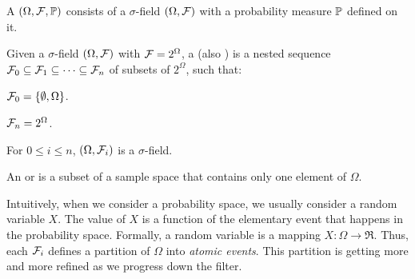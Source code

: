 \begin{defn}
    A  $(\Omega, \mathcal{F}, \mathbb{P})$ consists
    of a $\sigma$-field $(\Omega,\mathcal{F})$ with a probability measure
    $\mathbb{P}$ defined on it.
\end{defn}


\begin{defn}
    Given a $\sigma$-field $(\Omega, \mathcal{F})$ with $\mathcal{F}=2^{\Omega}$, a
     (also ) is a nested sequence $\mathcal{F}_0
    \subseteq \mathcal{F}_1 \subseteq \cdots \subseteq \mathcal{F}_n$ of subsets of
    $2^{\Omega}$, such that:
    \begin{compactenumA}
        \item $\mathcal{F}_0 = \left\{ {\emptyset, \Omega} \right\}$.
        \item $\mathcal{F}_n = 2^{\Omega}$.
        \item For $0\leq i \leq n$, $(\Omega, \mathcal{F}_i)$ is a
        $\sigma$-field.
    \end{compactenumA}
\end{defn}


\begin{defn}
    An  or  is a subset of
    a sample space that contains only one element of $\Omega$.
\end{defn}

Intuitively, when we consider a probability space, we usually consider
a random variable $X$. The value of $X$ is a function of the
elementary event that happens in the probability space. Formally, a
random variable is a mapping $X:\Omega \rightarrow \Re$.  Thus, each
$\mathcal{F}_i$ defines a partition of $\Omega$ into \emph{atomic
   events}. This partition is getting more and more refined as we
progress down the filter.

